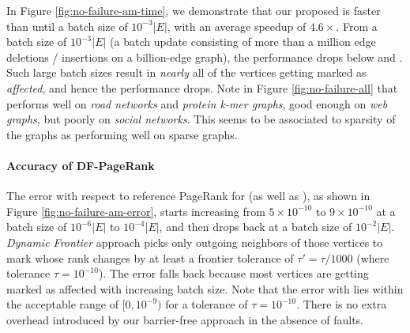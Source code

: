 In Figure \ref{fig:no-failure-am-time}, we demonstrate that our proposed \FroBarf{}  is faster than \NaiBarf{} until a batch size of $10^{-3} |E|$, with an average speedup of $4.6\times$. From a batch size of $10^{-3} |E|$ (a batch update consisting of more than a million edge deletions / insertions on a billion-edge graph), the performance drops below \NaiBarf{} and \StaBarf{}. Such large batch sizes result in {\em nearly} all of the vertices getting marked as {\em affected}, and hence the performance drops. Note in Figure \ref{fig:no-failure-all} that \FroBarf{} performs well on \textit{road networks} and \textit{protein k-mer graphs}, good enough on \textit{web graphs}, but poorly on \textit{social networks}. This seems to be associated to sparsity of the graphs as \FroBarf{} performing well on sparse graphs.















\paragraph{Accuracy of DF-PageRank}

The error with respect to reference PageRank for \FroBarf{} (as well as \FroWbar{}), as shown in Figure \ref{fig:no-failure-am-error}, starts increasing from $5\times10^{-10}$ to $9\times10^{-10}$ at a batch size of $10^{-6} |E|$ to $10^{-4} |E|$, and then drops back at a batch size of $10^{-2} |E|$. \textit{Dynamic Frontier} approach picks only outgoing neighbors of those vertices to mark whose rank changes by at least a frontier tolerance of $\tau' = \tau/1000$ (where tolerance $\tau = 10^{-10}$). The error falls back because most vertices are getting marked as affected with increasing batch size.  Note that the error with \FroBarf{} lies within the acceptable range of $[0, 10^{-9})$ for a tolerance of $\tau = 10^{-10}$. There is no extra overhead introduced by our barrier-free approach in the absence of faults.

